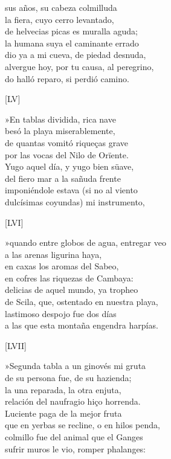 \documentclass[11pt,a4paper,twoside]{article}
\begin{document}
sus años, su cabeza colmilluda\\
la fiera, cuyo cerro levantado,\\
de helvecias picas es muralla aguda;\\
la humana suya el caminante errado\\
dio ya a mi cueva, de piedad desnuda,\\
alvergue hoy, por tu causa, al peregrino,\\
do halló reparo, si perdió camino.\pend
\begin{center}
	[LV]
\end{center}\pstart
»En tablas dividida, rica nave\\
besó la playa miserablemente,\\
de quantas vomitó riqueças grave\\
por las vocas del Nilo de Orïente.\\
Yugo aquel día, y yugo bien süave,\\
del fiero mar a la sañuda frente\\
imponiéndole estava (si no al viento\\
dulcísimas coyundas) mi instrumento,\pend
\begin{center}
	[LVI]
\end{center}\pstart
»quando entre globos de agua, entregar veo\\
a las arenas ligurina haya,\\
en caxas los aromas del Sabeo,\\
en cofres las riquezas de Cambaya:\\
delicias de aquel mundo, ya tropheo\\
de Scila, que, ostentado en nuestra playa,\\
lastimoso despojo fue dos días\\
a las que esta montaña engendra harpías.\pend
\begin{center}
	[LVII]
\end{center}\pstart
»Segunda tabla a un ginovés mi gruta\\
de su persona fue, de su hazienda;\\
la una reparada, la otra enjuta,\\
relación del naufragio hiço horrenda.\\
Luciente paga de la mejor fruta\\
que en yerbas se recline, o en hilos penda,\\
colmillo fue del animal que el Ganges\\
sufrir muros le vio, romper phalanges:\pend
\end{document}

